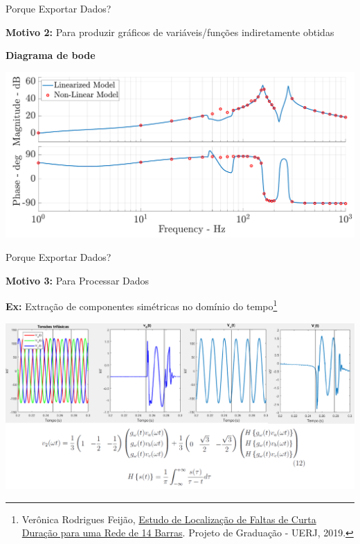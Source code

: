 \begin{frame}{Porque Exportar Dados?}
\centering


\textbf{Motivo 2:} Para produzir gráficos de variáveis/funções indiretamente obtidas
\vspace*{1cm}

\textbf{Diagrama de bode}
\vspace*{0.5cm}

\includegraphics[width=0.60\linewidth]{./figuras/Exportacao/ex_indireto}

\end{frame}






\begin{frame}{Porque Exportar Dados?}
\centering


\textbf{Motivo 3:} Para Processar Dados
\vspace*{0.5cm}

\textbf{Ex:} Extração de componentes simétricas no domínio do tempo\footnote[frame]{\tiny Verônica Rodrigues Feijão, \href{https://drive.google.com/file/d/1xZGZLela_iNW0KIjTQ59YyCL1-sb16IO/view}{Estudo de Localização de Faltas de Curta Duração para uma Rede de 14 Barras}. Projeto de Graduação -  UERJ, 2019.}
\vspace*{0.5cm}

\includegraphics[width=0.65\linewidth]{./figuras/Exportacao/ex_processamento}


\end{frame}






